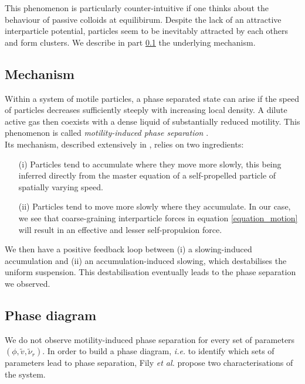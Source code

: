 \documentclass[class=report, float=false, crop=false]{standalone}
\begin{document}
This phenomenon is particularly counter-intuitive if one thinks about the behaviour of passive colloids at equilibirum. Despite the lack of an attractive interparticle potential, particles seem to be inevitably attracted by each others and form clusters. We describe in part \ref{mips_mechanism} the underlying mechanism.

\subsection{Mechanism}
\label{mips_mechanism}

Within a system of motile particles, a phase separated state can arise if the speed of particles decreases sufficiently steeply with increasing local density. A dilute active gas then coexists with a dense liquid of substantially reduced motility. This phenomenon is called \textit{motility-induced phase separation} \cite{cates2015motility}.\\

Its mechanism, described extensively in \cite{cates2015motility}, relies on two ingredients:
\begin{enumerate}
  \item[(i)] Particles tend to accumulate where they move more slowly, this being inferred directly from the master equation of a self-propelled particle of spatially varying speed.
  \item[(ii)] Particles tend to move more slowly where they accumulate. In our case, we see that coarse-graining interparticle forces in equation \ref{equation_motion} will result in an effective and lesser self-propulsion force.
\end{enumerate}
We then have a positive feedback loop between (i) a slowing-induced accumulation and (ii) an accumulation-induced slowing, which destabilises the uniform suspension. This destabilisation eventually leads to the phase separation we observed.

\subsection{Phase diagram}
\label{subsection:phase_diagram}

We do not observe motility-induced phase separation for every set of parameters $(\phi, \tilde{v}, \tilde{\nu}_r)$. In order to build a phase diagram, \textit{i.e.} to identify which sets of parameters lead to phase separation, Fily \textit{et al.} propose two characterisations of the system.
\end{document}
